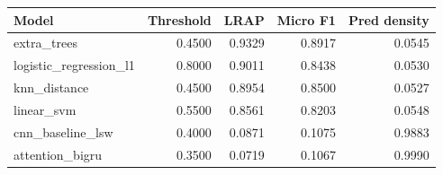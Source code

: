 \begin{tabular}{lrrrr}
\toprule
Model & Threshold & LRAP & Micro F1 & Pred density \\
\midrule
extra\_trees & 0.4500 & 0.9329 & 0.8917 & 0.0545 \\
logistic\_regression\_l1 & 0.8000 & 0.9011 & 0.8438 & 0.0530 \\
knn\_distance & 0.4500 & 0.8954 & 0.8500 & 0.0527 \\
linear\_svm & 0.5500 & 0.8561 & 0.8203 & 0.0548 \\
cnn\_baseline\_lsw & 0.4000 & 0.0871 & 0.1075 & 0.9883 \\
attention\_bigru & 0.3500 & 0.0719 & 0.1067 & 0.9990 \\
\bottomrule
\end{tabular}